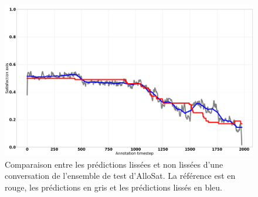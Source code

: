 \begin{figure}[h]
    \centering
    \includegraphics[width=.99\linewidth]{./Chapitre5/figures/lissage2.png}
    \caption{Comparaison entre les prédictions lissées et non lissées d'une conversation de l'ensemble de test d'AlloSat. La référence est en rouge, les prédictions en gris et les prédictions lissés en bleu.}
    \label{fig:lissage}
\end{figure}
